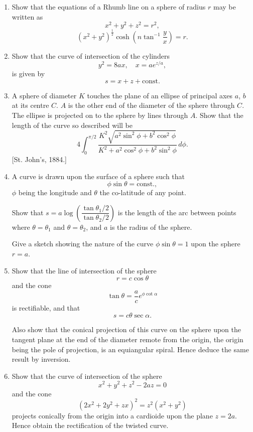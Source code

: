 \documentclass[11pt, a4paper]{article}
\newcommand{\source}[1]{\hfill\textnormal{[#1]}}
\begin{document}
\begin{enumerate}[leftmargin=2em]

\item Show that the equations of a Rhumb line on a sphere of radius $r$ may be written as
\[
x^2+y^2+z^2=r^2,
\]
\[
(x^2+y^2)^{\frac12}\cosh\left(n\tan^{-1}\frac{y}{x}\right)=r.
\]

\item Show that the curve of intersection of the cylinders
\[
y^2=8ax,\quad x=ae^{z/a},
\]
is given by
\[
s=x+z+\text{const.}
\]

\item A sphere of diameter $K$ touches the plane of an ellipse of principal axes $a$, $b$ at its centre $C$. $A$ is the other end of the diameter of the sphere through $C$. The ellipse is projected on to the sphere by lines through $A$. Show that the length of the curve so described will be
\[
4\int_0^{\pi/2}\frac{K^2\sqrt{a^2\sin^2\phi+b^2\cos^2\phi}}{K^2+a^2\cos^2\phi+b^2\sin^2\phi}\,d\phi.
\]
\source{St. John's, 1884.}

\item A curve is drawn upon the surface of a sphere such that
\[
\phi\sin\theta=\text{const.},
\]
$\phi$ being the longitude and $\theta$ the co-latitude of any point.

Show that $s=a\log\left(\dfrac{\tan\theta_1/2}{\tan\theta_2/2}\right)$ is the length of the arc between points where $\theta=\theta_1$ and $\theta=\theta_2$, and $a$ is the radius of the sphere.

Give a sketch showing the nature of the curve $\phi\sin\theta=1$ upon the sphere $r=a$.

\item Show that the line of intersection of the sphere
\[
r=c\cos\theta
\]
and the cone
\[
\tan\theta=\frac{a}{c}e^{\phi\cot\alpha}
\]
is rectifiable, and that
\[
s=c\theta\sec\alpha.
\]

Also show that the conical projection of this curve on the sphere upon the tangent plane at the end of the diameter remote from the origin, the origin being the pole of projection, is an equiangular spiral. Hence deduce the same result by inversion.

\item Show that the curve of intersection of the sphere
\[
x^2+y^2+z^2-2az=0
\]
and the cone
\[
(2x^2+2y^2+zx)^2=z^2(x^2+y^2)
\]
projects conically from the origin into a cardioide upon the plane $z=2a$. Hence obtain the rectification of the twisted curve.


\end{enumerate}
\end{document}
